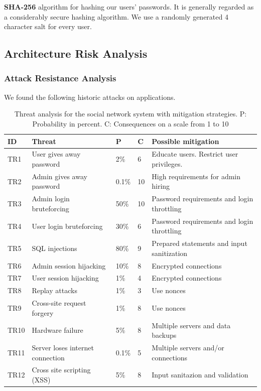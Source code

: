 \documentclass[a4paper]{article}
\begin{document}
\textbf{SHA-256} algorithm for hashing our users' passwords. It is generally regarded as a considerably secure hashing algorithm.
We use a randomly generated 4 character salt for every user.


\subsection{Architecture Risk Analysis}


\subsubsection{Attack Resistance Analysis}
We found the following historic attacks on applications.

\begin{table}[h!]
	\begin{tabular}{| l | p{4cm} | l | l | p{5cm} |}
		\hline
		\textbf{ID} & \textbf{Threat} & \textbf{P} & \textbf{C} & \textbf{Possible mitigation} \\ \hline
		TR1 & User gives away password & 2\% & 6 & Educate users. Restrict user privileges. \\ \hline
        TR2 & Admin gives away password & 0.1\%  & 10 & High requirements for admin hiring \\ \hline
        TR3 & Admin login bruteforcing & 50\% & 10 & Password requirements and login throttling \\ \hline
        TR4 & User login bruteforcing & 30\% & 6 & Password requirements and login throttling \\ \hline
        TR5 & SQL injections & 80\% & 9 & Prepared statements and input sanitization \\ \hline
        TR6 & Admin session hijacking & 10\% & 8 & Encrypted connections \\ \hline
        TR7 & User session hijacking & 1\% & 4 & Encrypted connections \\ \hline
        TR8 & Replay attacks & 1\% & 3 & Use nonces \\ \hline
       	TR9 & Cross-site request forgery & 1\% & 8 & Use nonces \\ \hline
        TR10 & Hardware failure & 5\% & 8 & Multiple servers and data backups \\ \hline
        TR11 & Server loses internet connection & 0.1\% & 5 & Multiple servers and/or connections \\ \hline
        TR12 & Cross site scripting (XSS) & 5\% & 8 & Input sanitazion and validation \\ \hline
	\end{tabular}
	\caption{Threat analysis for the social network system with mitigation strategies. P: Probability in percent. C: Consequences on a scale from 1 to 10}
		\label{tab:threats}
\end{table}
\end{document}
